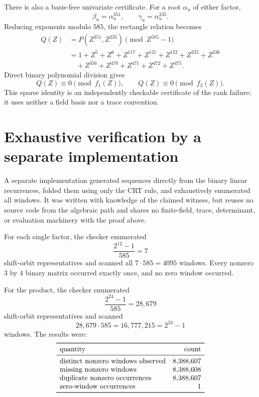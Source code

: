 \documentclass[11pt]{article}
\begin{document}
There is also a basis-free univariate certificate.  For a root
\(\alpha_u\) of either factor,
\[
 \beta_u=\alpha_u^{351},\qquad
 \gamma_u=\alpha_u^{235}.
\]
Reducing exponents modulo \(585\), the rectangle relation becomes
\[
\begin{aligned}
 Q(Z)&=P(Z^{351},Z^{235})\pmod {Z^{585}-1}\\
 &=1+Z^5+Z^6+Z^{117}+Z^{121}+Z^{122}
   +Z^{235}+Z^{236}\\
 &\quad+Z^{356}+Z^{470}+Z^{471}+Z^{472}+Z^{475}.
\end{aligned}
\]
Direct binary polynomial division gives
\[
 Q(Z)\equiv0\pmod {f_1(Z)},\qquad
 Q(Z)\equiv0\pmod {f_2(Z)}.
\]
This sparse identity is an independently checkable certificate of the
rank failure; it uses neither a field basis nor a trace convention.

\section{Exhaustive verification by a separate implementation}

A separate implementation generated sequences directly from the binary
linear recurrences, folded them using only the CRT rule, and exhaustively
enumerated all windows.  It was written with knowledge of the claimed
witness, but reuses no source code from the algebraic path and shares
no finite-field, trace, determinant, or evaluation machinery with the
proof above.

For each single factor, the checker enumerated
\[
 \frac{2^{12}-1}{585}=7
\]
shift-orbit representatives and scanned all \(7\cdot585=4095\) windows.
Every nonzero \(3\) by \(4\) binary matrix occurred exactly once, and no
zero window occurred.

For the product, the checker enumerated
\[
 \frac{2^{24}-1}{585}=28{,}679
\]
shift-orbit representatives and scanned
\[
 28{,}679\cdot585=16{,}777{,}215=2^{24}-1
\]
windows.  The results were:
\[
\begin{array}{lr}
\toprule
\text{quantity}&\text{count}\\
\midrule
\text{distinct nonzero windows observed}&8{,}388{,}607\\
\text{missing nonzero windows}&8{,}388{,}608\\
\text{duplicate nonzero occurrences}&8{,}388{,}607\\
\text{zero-window occurrences}&1\\
\bottomrule
\end{array}
\]
\end{document}
